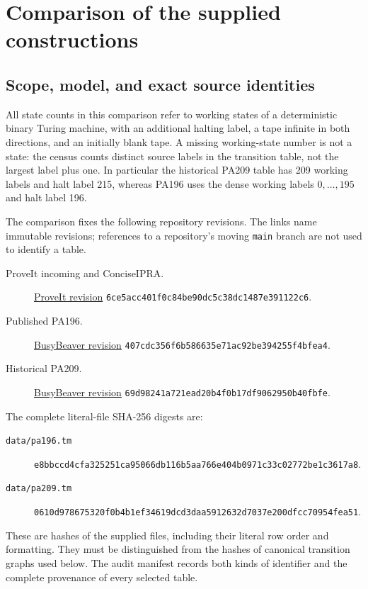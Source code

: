 \section{Comparison of the supplied constructions}
\label{sec:comparison-audit}

\subsection{Scope, model, and exact source identities}
All state counts in this comparison refer to working states of a deterministic
binary Turing machine, with an additional halting label, a tape infinite in
both directions, and an initially blank tape.  A missing working-state number
is not a state: the census counts distinct source labels in the transition
table, not the largest label plus one.  In particular the historical
PA209 table has 209 working labels and halt label 215, whereas PA196 uses the
dense working labels $0,\ldots,195$ and halt label 196.

The comparison fixes the following repository revisions.  The links name
immutable revisions; references to a repository's moving \texttt{main} branch
are not used to identify a table.
\begin{description}
\item[ProveIt incoming and ConciseIPRA.]
\href{https://github.com/VladimirReshetnikov/ProveIt/tree/6ce5acc401f0c84be90dc5c38dc1487e391122c6}{ProveIt revision}
\nolinkurl{6ce5acc401f0c84be90dc5c38dc1487e391122c6}.
\item[Published PA196.]
\href{https://github.com/jamesyc/BusyBeaver/tree/407cdc356f6b586635e71ac92be394255f4bfea4}{BusyBeaver revision}
\nolinkurl{407cdc356f6b586635e71ac92be394255f4bfea4}.
\item[Historical PA209.]
\href{https://github.com/jamesyc/BusyBeaver/tree/69d98241a721ead20b4f0b17df9062950b40fbfe}{BusyBeaver revision}
\nolinkurl{69d98241a721ead20b4f0b17df9062950b40fbfe}.
\end{description}

The complete literal-file SHA-256 digests are:
\begin{description}
\item[\texttt{data/pa196.tm}]
\nolinkurl{e8bbccd4cfa325251ca95066db116b5aa766e404b0971c33c02772be1c3617a8}.
\item[\texttt{data/pa209.tm}]
\nolinkurl{0610d978675320f0b4b1ef34619dcd3daa5912632d7037e200dfcc70954fea51}.
\end{description}
These are hashes of the supplied files, including their literal row order and
formatting.  They must be distinguished from the hashes of canonical
transition graphs used below.  The audit manifest records both kinds of
identifier and the complete provenance of every selected table.

